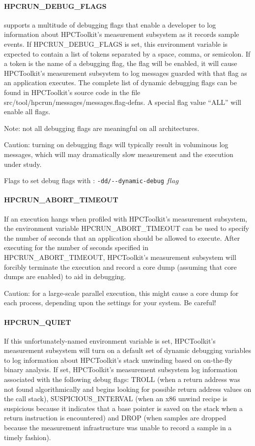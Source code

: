 \paragraph{HPCRUN\_DEBUG\_FLAGS}

\HPCToolkit{} supports a multitude of debugging flags that enable a
developer to log information about HPCToolkit's measurement subsystem
as it records sample events. If HPCRUN\_DEBUG\_FLAGS is set, this
environment variable is expected to contain a list of tokens separated
by a space, comma, or semicolon. If a token is the name of a debugging
flag, the flag will be enabled, it will cause HPCToolkit's measurement
subsystem to log messages guarded with that flag as an application
executes. The complete list of dynamic debugging flags can be found
in HPCToolkit's source code in the file
src/tool/hpcrun/messages/messages.flag-defns. A special flag value
“ALL” will enable all flags. 

\parg
Note: not all debugging flags are
meaningful on all architectures. 

\parg 
Caution: turning on debugging flags
will typically result in voluminous log messages, which will may
dramatically slow measurement and the execution under study.

\parg
Flags to set debug flags with \hpcrun: \verb|-dd/--dynamic-debug| $flag$

\paragraph{HPCRUN\_ABORT\_TIMEOUT}

If an execution hangs when profiled with HPCToolkit's measurement
subsystem, the environment variable HPCRUN\_ABORT\_TIMEOUT can be
used to specify the number of seconds that an application should
be allowed to execute. After executing for the number of seconds
specified in HPCRUN\_ABORT\_TIMEOUT, HPCToolkit's measurement
subsystem will forcibly terminate the execution and record a core
dump (assuming that core dumps are enabled) to aid in debugging.

\parg
Caution: for a large-scale parallel execution, this might cause a
core dump for each process, depending upon the settings for your
system. Be careful!

\paragraph{HPCRUN\_QUIET}

If this unfortunately-named environment variable is set, HPCToolkit's
measurement subsystem will turn on a default set of dynamic debugging
variables to log information about HPCToolkit's stack unwinding
based on on-the-fly binary analysis. If set, HPCToolkit's measurement
subsystem log information associated with the following debug flags:
TROLL (when a return address was not found algorithmically
and \HPCToolkit{} begins looking for possible return address values
on the call stack), SUSPICIOUS\_INTERVAL (when an x86 unwind recipe
is suspicious because it indicates that a base pointer is saved on
the stack when a return instruction is encountered) and DROP (when
samples are dropped because the measurement infrastructure was
unable to record a sample in a timely fashion).

